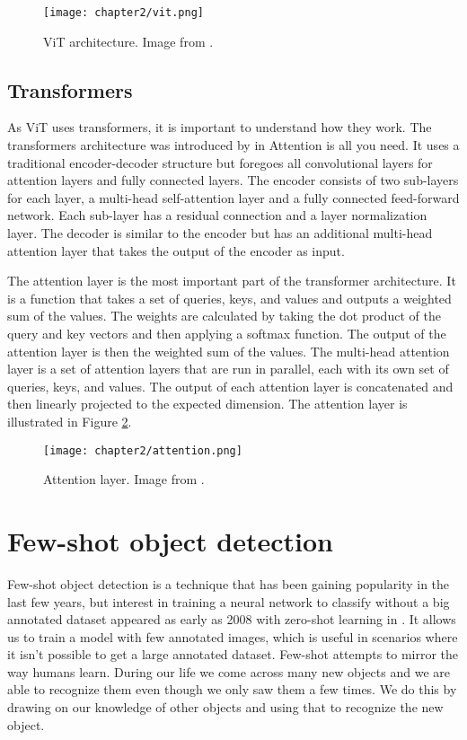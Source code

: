 \begin{figure}[H]
	\centering
	\texttt{[image: chapter2/vit.png]}
	\caption{\label{fig:2_vit} ViT architecture. Image from \citet{vit}.}
\end{figure}

\subsection{Transformers \cite{transformers}}
As ViT uses transformers, it is important to understand how they work. The transformers architecture was introduced by \citet{transformers} in Attention is all you need. It uses a traditional encoder-decoder structure but foregoes all convolutional layers for attention layers and fully connected layers. The encoder consists of two sub-layers for each layer, a multi-head self-attention layer and a fully connected feed-forward network. Each sub-layer has a residual connection and a layer normalization layer. The decoder is similar to the encoder but has an additional multi-head attention layer that takes the output of the encoder as input. 

The attention layer is the most important part of the transformer architecture. It is a function that takes a set of queries, keys, and values and outputs a weighted sum of the values. The weights are calculated by taking the dot product of the query and key vectors and then applying a softmax function. The output of the attention layer is then the weighted sum of the values. The multi-head attention layer is a set of attention layers that are run in parallel, each with its own set of queries, keys, and values. The output of each attention layer is concatenated and then linearly projected to the expected dimension. The attention layer is illustrated in Figure \ref{fig:2_attention}.

\begin{figure}[H]
	\centering
	\texttt{[image: chapter2/attention.png]}
	\caption{\label{fig:2_attention} Attention layer. Image from \citet{transformers}.}
\end{figure}


\section{Few-shot object detection}
Few-shot object detection is a technique that has been gaining popularity in the last few years, but interest in training a neural network to classify without a big annotated dataset appeared as early as 2008 with zero-shot learning in \citet{aaai08-132}. It allows us to train a model with few annotated images, which is useful in scenarios where it isn't possible to get a large annotated dataset. Few-shot attempts to mirror the way humans learn. During our life we come across many new objects and we are able to recognize them even though we only saw them a few times. We do this by drawing on our knowledge of other objects and using that to recognize the new object\cite{biederman1987recognition}. 

